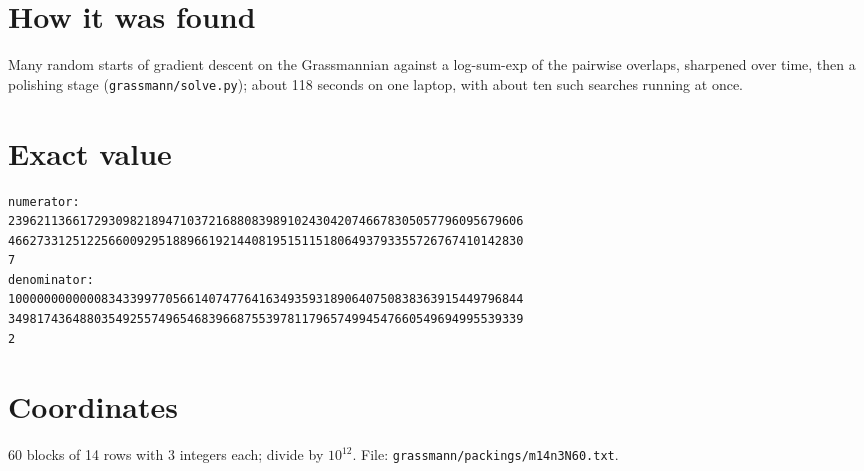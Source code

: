 \documentclass[11pt,a4paper]{article}
\begin{document}
\section{How it was found}
Many random starts of gradient descent on the Grassmannian against a log-sum-exp of the pairwise overlaps, sharpened over time, then a polishing stage (\texttt{grassmann/solve.py}); about 118 seconds on one laptop, with about ten such searches running at once.


\appendix
\section{Exact value}
{\small
\begin{verbatim}
numerator:
239621136617293098218947103721688083989102430420746678305057796095679606
466273312512256600929518896619214408195151151806493793355726767410142830
7
denominator:
100000000000083433997705661407477641634935931890640750838363915449796844
349817436488035492557496546839668755397811796574994547660549694995539339
2
\end{verbatim}}

\section{Coordinates}
60 blocks of 14 rows with 3 integers each; divide by $10^{12}$. File: \texttt{grassmann/packings/m14n3N60.txt}.
{\tiny
\begin{multicols}{3}
\end{multicols}}
\end{document}
